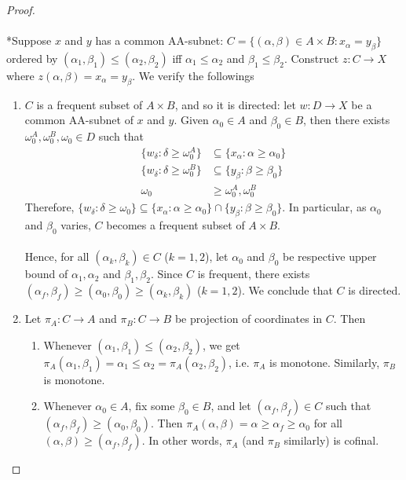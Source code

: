 \documentclass{treatise}
\begin{document}
\begin{proof}
\\
\\
*Suppose $x$ and $y$ has a common AA-subnet: $C = \{ (\alpha, \beta) \in A \times B : x_\alpha = y_\beta \}$ ordered by $(\alpha_1, \beta_1) \leq (\alpha_2, \beta_2)$ iff $\alpha_1 \leq \alpha_2$ and $\beta_1 \leq \beta_2$. Construct $z: C \to X$ where $z(\alpha, \beta) = x_\alpha = y_\beta$. We verify the followings
\begin{enumerate}
    \item $C$ is a frequent subset of $A \times B$, and so it is directed: let $w: D \to X$ be a common AA-subnet of $x$ and $y$. Given $\alpha_0 \in A$ and $\beta_0 \in B$, then there exists $\omega_0^A, \omega_0^B, \omega_0 \in D$ such that
    \begin{align*}
        \{ w_\delta : \delta \geq \omega_0^A \} & \subseteq \{ x_\alpha : \alpha \geq \alpha_0 \}
        \\
        \{ w_\delta : \delta \geq \omega_0^B \} & \subseteq \{ y_\beta : \beta \geq \beta_0 \}
        \\
        \omega_0 & \geq \omega_0^A, \omega_0^B
    \end{align*}
    Therefore, $\{ w_\delta : \delta \geq \omega_0 \} \subseteq \{ x_\alpha : \alpha \geq \alpha_0 \} \cap \{ y_\beta : \beta \geq \beta_0 \}$. In particular, as $\alpha_0$ and $\beta_0$ varies, $C$ becomes a frequent subset of $A \times B$.
    \\
    \\
    Hence, for all $(\alpha_k, \beta_k) \in C$ ($k = 1, 2$), let $\alpha_0$ and $\beta_0$ be respective upper bound of $\alpha_1, \alpha_2$ and $\beta_1, \beta_2$. Since $C$ is frequent, there exists $(\alpha_f, \beta_f) \geq (\alpha_0, \beta_0) \geq (\alpha_k, \beta_k)$ ($k = 1, 2$). We conclude that $C$ is directed.
    \item Let $\pi_A : C \to A$ and $\pi_B : C \to B$ be projection of coordinates in $C$. Then
    \begin{enumerate}
        \item Whenever $(\alpha_1, \beta_1) \leq (\alpha_2, \beta_2)$, we get $\pi_A (\alpha_1, \beta_1) = \alpha_1 \leq \alpha_2 = \pi_A (\alpha_2, \beta_2)$, i.e. $\pi_A$ is monotone. Similarly, $\pi_B$ is monotone.
        \item Whenever $\alpha_0 \in A$, fix some $\beta_0 \in B$, and let $(\alpha_f, \beta_f) \in C$ such that $(\alpha_f, \beta_f) \geq (\alpha_0, \beta_0)$. Then $\pi_A (\alpha, \beta) = \alpha \geq \alpha_f \geq \alpha_0$ for all $(\alpha, \beta) \geq (\alpha_f, \beta_f)$. In other words, $\pi_A$ (and $\pi_B$ similarly) is cofinal.

\end{enumerate}
\end{enumerate}
\end{proof}
\end{document}
